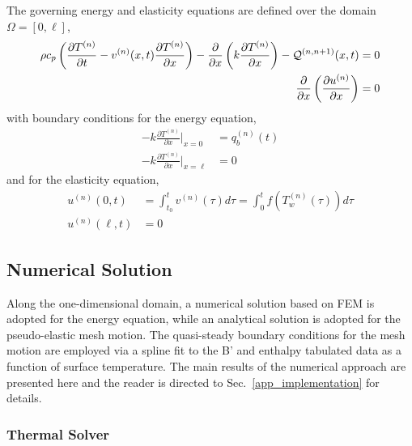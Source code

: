 The governing energy and elasticity equations are defined over the domain $\Omega=[0,\ell]$,
\begin{subequations}
    \begin{align}
        \rho c_p\left(\frac{\partial T^{(n)}}{\partial t} - v^{(n)}(x,t)\frac{\partial T^{(n)}}{\partial x}\right) - \frac{\partial}{\partial x}\left(k\frac{\partial T^{(n)}}{\partial x}\right) - \mathcal{Q}^{(n,n+1)}(x,t) &= 0\label{eqn_thermal_1d}\\
        \frac{\partial}{\partial x}\left(\frac{\partial u^{(n)}}{\partial x}\right) &= 0\label{eqn_elasticity_1d}
    \end{align}\label{eqn_rpm}
\end{subequations}
with boundary conditions for the energy equation,
\begin{subequations}
    \begin{align}
        -k\frac{\partial T^{(n)}}{\partial x}\Bigg|_{x=0} &= q^{(n)}_b(t)\\
        -k\frac{\partial T^{(n)}}{\partial x}\Bigg|_{x=\ell} &= 0
    \end{align}
\end{subequations}
and for the elasticity equation,
\begin{subequations}
    \begin{align}
        u^{(n)}(0,t) &= \int_{t_0}^{t}v^{(n)}(\tau)d\tau = \int_{0}^{t} f(T^{(n)}_w(\tau))d\tau\\
        u^{(n)}(\ell,t) &= 0
    \end{align}
\end{subequations}

\subsection{Numerical Solution}

Along the one-dimensional domain, a numerical solution based on FEM is adopted for the energy equation, while an analytical solution is adopted for the pseudo-elastic mesh motion. The quasi-steady boundary conditions for the mesh motion are employed via a spline fit to the B' and enthalpy tabulated data as a function of surface temperature. The main results of the numerical approach are presented here and the reader is directed to Sec.~\ref{app_implementation} for details.

\subsubsection{Thermal Solver}

